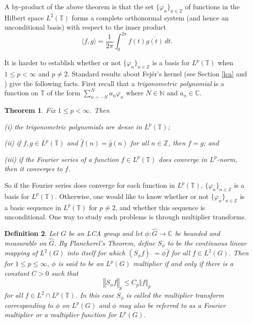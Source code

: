 \documentclass[honours,12pt]{unswthesis}
\newcommand{\C}{\mathbb{C}}
\newcommand{\N}{\mathbb{N}}
\newcommand{\T}{\mathbb{T}}
\newcommand{\Z}{\mathbb{Z}}
\newcommand{\hatt}[1]{\widehat #1}
\def\ip<#1,#2>{\langle #1,#2 \rangle}
\def\norm#1{\left \Vert #1 \right \Vert}
\newtheorem{theorem}{Theorem}[section]
\newtheorem{definition}[theorem]{Definition}
\numberwithin{equation}{section}
\begin{document}
A by-product of the above theorem is that the set $\{\varphi_n\}_{n\in\Z}$ of
functions in the Hilbert space $L^2(\T)$ forms a complete orthonormal system 
(and
hence an unconditional basis) with respect to the inner product
\[\ip<f,g>=\frac{1}{2\pi}\int_0^{2\pi}f(t)\overline{g(t)}\,dt.\]

It is harder to establish whether or not $\{\varphi_n\}_{n\in\Z}$ is a basis for
$L^p(\T)$ when $1\leq p<\infty$ and $p\neq2$. Standard results about Fej\'{e}r's
kernel (see Section \ref{lca} and \cite[I.2.6]{Katznelson}) give the following
facts. First recall that a {\em trigonometric polynomial} is a function on 
$\T$ of 
the form $\sum_{n=-N}^Na_n\varphi_n$ where $N\in\N$ and $a_n\in\C$.

\begin{theorem}\label{Fejer facts}
Fix $1\leq p<\infty$. Then

(i) the trigonometric polynomials are dense in $L^p(\T)$;

(ii) if $f,g\in L^p(\T)$ and $\hatt{f}(n)=\hatt{g}(n)$ for all $n\in\Z$,
then $f=g$; and


(iii) if the Fourier series of a function $f\in L^p(\T)$ does converge in
$L^p$-norm, then it converges to $f$.
\end{theorem}

So if the Fourier series does converge for each function in $L^p(\T)$,
$\{\varphi_n\}_{n\in\Z}$ is a basis for $L^p(\T)$. Otherwise,
one would like to know whether or not $\{\varphi_n\}_{n\in\Z}$ is a basic 
sequence in $L^p(\T)$ for $p\neq2$, and whether this sequence is unconditional.
One way to study such problems is through multiplier transforms.

\begin{definition}\label{multipliers}
Let $G$ be an LCA group and let
$\phi:\hatt{G}\rightarrow\C$ be bounded and measurable on $\hatt{G}$. By
Plancherel's Theorem, define $S_{\phi}$ to be the continuous linear mapping of
$L^2(G)$ into itself for which
$({S_{\phi}f})\,\hatt{\,} = \phi \hatt{f}$ for all $f\in L^2(G)$.
Then for $1\leq p\leq\infty$, $\phi$ is said to be an 
{\em $L^p(G)$ multiplier} if
and only if there is a constant $C>0$ such that
\begin{equation}\label{eq-multiplier norm}
\norm{S_{\phi}f}_p\leq C_p\norm{f}_p
\end{equation}
for all $f\in L^2\cap L^p(\T)$.
In this case $S_{\phi}$ is called the {\em multiplier transform corresponding
to $\phi$ on $L^p(G)$} and $\phi$ may also be referred to as a
{\em Fourier multiplier} or a {\em multiplier function} for $L^p(G)$.
\end{definition}
\end{document}
